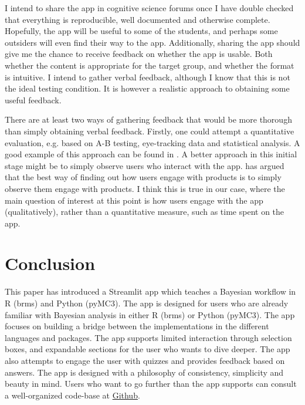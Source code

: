 \documentclass[12pt]{article}
\begin{document}
\vspace{5mm}

I intend to share the app in cognitive science forums once I have double checked
that everything is reproducible, well documented and otherwise complete. Hopefully,
the app will be useful to some of the students, and perhaps some outsiders will even
find their way to the app. Additionally, sharing the app should give me the chance
to receive feedback on whether the app is usable. Both whether the content is
appropriate for the target group,
and whether the format is intuitive. I intend to gather verbal feedback,
although I know that this is not the ideal testing condition.
It is however a realistic approach to obtaining some useful feedback.

\vspace{5mm}

There are at least two ways of gathering feedback that would be more thorough
than simply obtaining verbal feedback. Firstly, one could attempt a quantitative evaluation,
e.g. based on A-B testing, eye-tracking data and statistical analysis.
A good example of this approach can be found in \textcite{sutcliffe2016}.
A better approach in this initial stage might be to simply observe users who interact
with the app. \textcite{norman1999} has argued that the best way of finding
out how users engage with products is to simply observe them engage with products.
I think this is true in our case, where the main question of interest at this
point is how users engage with the app (qualitatively), rather than a
quantitative measure, such as time spent on the app.

\section{Conclusion}
This paper has introduced a Streamlit app which teaches a Bayesian workflow in R (brms)
and Python (pyMC3). The app is designed for users who are already familiar with Bayesian
analysis in either R (brms) or Python (pyMC3). The app focuses on building a bridge
between the implementations in the different languages and packages.
The app supports limited interaction through selection boxes, and expandable
sections for the user who wants to dive deeper. The app also attempts to engage
the user with quizzes and provides feedback based on answers. The app is designed with
a philosophy of consistency, simplicity and beauty in mind. Users who want to
go further than the app supports can consult a well-organized code-base at
\href{https://github.com/victor-m-p/BayesWorkflow}{Github}.
\printbibliography
\end{document}
